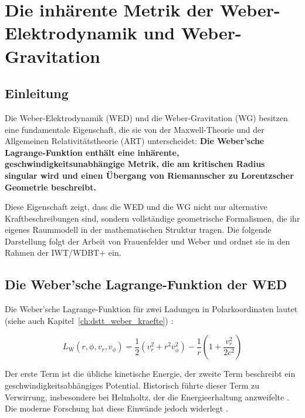 
\chapter{Die inhärente Metrik der Weber-Elektrodynamik und Weber-Gravitation}
\label{app:weber_metrik}

\section{Einleitung}
\label{app:weber_metrik_einleitung}

Die Weber-Elektrodynamik (WED) und die Weber-Gravitation (WG) besitzen eine fundamentale Eigenschaft, die sie von der Maxwell-Theorie und der Allgemeinen Relativitätstheorie (ART) unterscheidet: \textbf{Die Weber'sche Lagrange-Funktion enthält eine inhärente, geschwindigkeitsunabhängige Metrik, die am kritischen Radius singular wird und einen Übergang von Riemannscher zu Lorentzscher Geometrie beschreibt.} \cite{FrauenfelderWeber2024}

Diese Eigenschaft zeigt, dass die WED und die WG nicht nur alternative Kraftbeschreibungen sind, sondern vollständige geometrische Formalismen, die ihr eigenes Raummodell in der mathematischen Struktur tragen. Die folgende Darstellung folgt der Arbeit von Frauenfelder und Weber \cite{FrauenfelderWeber2024} und ordnet sie in den Rahmen der IWT/WDBT+ ein.

\section{Die Weber'sche Lagrange-Funktion der WED}
\label{app:weber_metrik_lagrange_wed}

Die Weber'sche Lagrange-Funktion für zwei Ladungen in Polarkoordinaten lautet (siehe auch Kapitel~\ref{ch:dstt_weber_kraefte}) \cite{Assis2005}:

\[
L_{\mathrm{W}}(r,\phi,v_r,v_\phi) = \frac{1}{2}(v_r^2 + r^2 v_\phi^2) - \frac{1}{r}\left(1 + \frac{v_r^2}{2c^2}\right)
\tag{M.1}
\]

Der erste Term ist die übliche kinetische Energie, der zweite Term beschreibt ein geschwindigkeitsabhängiges Potential. Historisch führte dieser Term zu Verwirrung, insbesondere bei Helmholtz, der die Energieerhaltung anzweifelte \cite{Assis2005}. Die moderne Forschung hat diese Einwände jedoch widerlegt \cite{Assis2012}.

